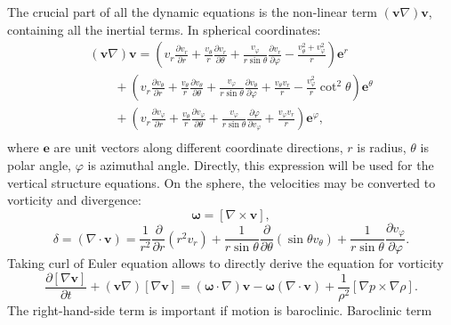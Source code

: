 \documentclass[usenatbib,onecolumn]{mnras}
\renewcommand{\vector}[1]{\ensuremath{\mathbf{#1}}}
\newcommand{\pardir}[2]{\ensuremath{\frac{\partial #2}{\partial #1} }}
\newcommand{\ppardir}[2]{\ensuremath{\frac{\partial }{\partial #1} \left( #2\right)}}
\begin{document}
The crucial part of all the dynamic equations is the non-linear term
$(\vector{v}\nabla) \vector{v}$, containing all the inertial terms. In
spherical coordinates:
\begin{equation}\label{E:vdv}
  \begin{array}{l}
\displaystyle  (\vector{v}\nabla) \vector{v} = \left( v_r \pardir{r}{v_r} +
  \frac{v_\theta}{r} \pardir{\theta}{v_r} + \frac{v_\varphi}{r \sin
    \theta} \pardir{\varphi}{v_r} - \frac{v_\theta^2+v_\varphi^2}{r}\right)
  \vector{e}^r  \\
\displaystyle   \qquad{}   + \left( v_r \pardir{r}{v_\theta} + \frac{v_\theta}{r}\pardir{\theta}{v_\theta} +
  \frac{v_\varphi}{r\sin\theta} \pardir{\varphi}{v_\theta} + \frac{v_\theta
    v_r}{r} - \frac{v_\varphi^2}{r}\cot^2\theta\right) \vector{e}^\theta
   \\
\displaystyle   \qquad{}   +
   \left( v_r \pardir{r}{v_\varphi}  + 
   \frac{v_\theta}{r}\pardir{\theta}{v_\varphi} +
   \frac{v_\varphi}{r\sin\theta}\pardir{v_\varphi}{\varphi} + \frac{v_\varphi
     v_r}{r}\right) \vector{e}^\varphi,\\
   \end{array}
\end{equation}
where $\vector{e}$ are unit vectors along different coordinate directions, $r$
is radius, $\theta$ is polar angle, $\varphi$ is azimuthal
angle. Directly, this expression will be used for the vertical structure
equations. On the sphere, the velocities may be converted to
vorticity  and divergence:
\begin{equation}\label{E:vort}
  \displaystyle   \vector{\omega} = \left[ \nabla \times \vector{v}\right],
\end{equation}
\begin{equation}\label{E:div}
\displaystyle   \delta = (\nabla \cdot \vector{v}) = \frac{1}{r^2}\ppardir{r}{r^2v_r} +
  \frac{1}{r\sin \theta} \ppardir{\theta}{\sin \theta v_\theta} + \frac{1}{r\sin \theta}\pardir{\varphi}{v_\varphi} .
\end{equation}
Taking curl of Euler equation allows to directly derive the equation for
vorticity
\begin{equation}\label{E:Ecurl}
\displaystyle   \pardir{t}{\left[\nabla \vector{v}\right]} +
  (\vector{v}\nabla)\left[\nabla \vector{v}\right] = (\vector{\omega} \cdot
\nabla) \vector{v} - \vector{\omega} (\nabla \cdot \vector{v}) +
  \frac{1}{\rho^2}\left[\nabla p \times \nabla \rho \right].
\end{equation}
The right-hand-side term is important if motion is baroclinic. Baroclinic term
\end{document}
